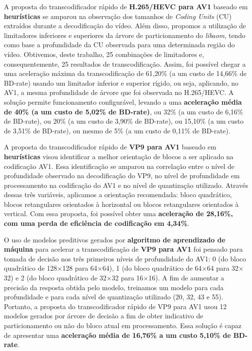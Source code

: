 A proposta do transcodificador rápido de \textbf{H.265/HEVC para AV1} baseado em \textbf{heurísticas} se amparou na observação dos tamanhos de \textit{Coding Units} (CU) extraídos durante a decodificação do vídeo. Além disso, propomos a utilização de limitadores inferiores e superiores da árvore de particionamento do \textit{libaom}, tendo como base a profundidade da CU observada para uma determinada região do vídeo. Obtivemos, deste trabalho, 25 combinações de limitadores e, consequentemente, 25 resultados de transcodificação. Assim, foi possível chegar a uma aceleração máxima da transcodificação de 61,20\% (a um custo de 14,66\% de BD-rate) usando um limitador inferior e superior rígido, ou seja, aplicando, no AV1, a mesma profundidade de árvore que foi observada no H.265/HEVC. A solução permite funcionamento configurável, levando a uma \textbf{aceleração média de 40\% (a um custo de 5,02\% de BD-rate)}, ou 32\% (a um custo de 6,16\% de BD-rate), ou 20\% (a um custo de 3,90\% de BD-rate), ou 15,10\% (a um custo de 3,51\% de BD-rate), ou mesmo de 5\% (a um custo de 0,11\% de BD-rate).

A proposta do transcodificador rápido de \textbf{VP9 para AV1} baseado em \textbf{heurísticas} visou identificar a melhor orientação de blocos a ser aplicado na codificação AV1. Essa identificação se amparou  na correlação entre o nível de profundidade observado na decodificação do VP9, no nível de profundidade em processamento na codificação do AV1 e no nível de quantização utilizado. Através dessas três variáveis, aplicamos a orientação recomendada: bloco quadrático, blocos retangulares orientados à horizontal ou blocos retangulares orientados à vertical. Com essa proposta, foi possível obter uma \textbf{aceleração de 28,16\%, com uma perda de eficiência de codificação em 4,34\%}.

O uso de modelos preditivos gerados por \textbf{algoritmo de aprendizado de máquina} para acelerar a transcodificação de \textbf{VP9 para AV1} foi pensado para tomada de decisão nos três primeiros níveis de profundidade do AV1: 0 (do bloco quadrático de 128$\times$128 para 64$\times$64), 1 (do bloco quadrático de 64$\times$64 para 32$\times$32) e 2 (do bloco quadrático de 32$\times$32 para 16$\times$16). A fim de aumentar a precisão da resposta obtida pelo modelo, treinamos um modelo para cada profundidade e para cada nível de quantização utilizado (20, 32, 43 e 55). Portanto, a proposta do transcodificador rápido de VP9 para AV1 usou 12 modelos gerados por árvore de decisão a fim de obter indicativo de particionamento ou não do bloco atual em processamento. Essa solução é capaz de apresentar uma \textbf{aceleração média de 16,76\% a um custo 5,10\% de BD-rate}.


